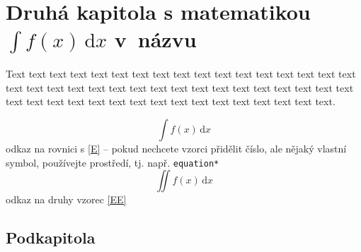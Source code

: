 \chapter{Druhá kapitola s matematikou \texorpdfstring{$\int\! f(x)\,\mathrm{d}x$}{int f(x) dx} v~názvu}

% 
% 
% 
% 
% 

Text text  text  text  text  text  text  text  text  text  text  text  text  text  text  text  text  text  text  text 
text  text  text  text  text  text  text  text  text  text  text  text  text  text  text  text  text  text  text  text 
text  text  text  text  text  text  text  text  text  text.

\begin{equation*}\label{E}\tag{rovnice}
 \int\! f(x)\,\mathrm{d}x
\end{equation*}
odkaz na rovnici s  \eqref{E} -- pokud nechcete vzorci přidělit číslo, ale nějaký vlastní symbol, používejte
 prostředí, tj. např. \verb+equation*+
\begin{equation}\label{EE}
 \iint\! f(x)\,\mathrm{d}x
\end{equation}
odkaz na druhy vzorec \eqref{EE}


\section{Podkapitola}


